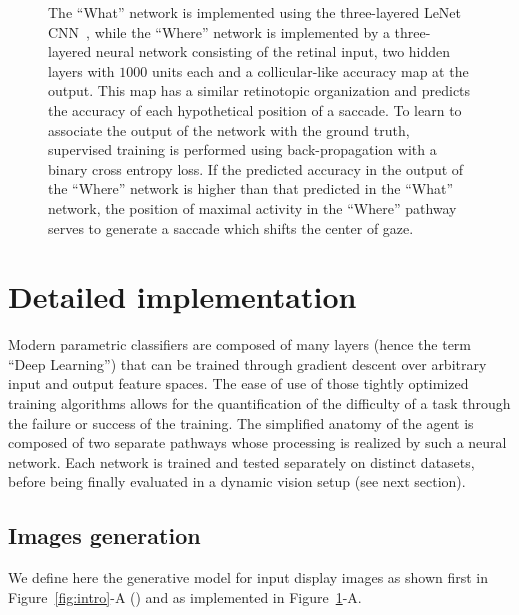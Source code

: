 \begin{figure}[t!]
{		The ``What'' network is implemented using the three-layered LeNet CNN~\cite{Lecun1998}, while the ``Where'' network is implemented by a three-layered neural network consisting of the retinal input, two hidden layers with $1000$ units each and a collicular-like accuracy map at the output.  This map has a similar retinotopic organization and predicts the accuracy of each hypothetical position of a saccade. %
		To learn to associate the output of the network with the ground truth, supervised training is performed using back-propagation with a binary cross entropy loss. 
		\D 
		If the predicted accuracy in the output of the ``Where'' network is higher than that predicted in the ``What'' network, the position of maximal activity in the ``Where'' pathway serves to generate a saccade which shifts the center of gaze. %
		\label{fig:methods}}%
\end{figure}%

\section*{Detailed implementation}
\label{sec:implementation}

Modern parametric classifiers are composed of many layers (hence the term ``Deep Learning'') that can be trained through gradient descent over arbitrary input and output feature spaces. The ease of use of those tightly optimized training algorithms allows for the quantification of the difficulty of a task through the failure or success of the training.
The simplified anatomy of the agent is composed of two separate pathways whose processing is realized by such a neural network. Each network is trained and tested separately on distinct datasets, before being finally evaluated in a dynamic vision setup (see next section). 


\subsection*{Images generation}
We define here the generative model for input display images as shown first in Figure~\ref{fig:intro}-A (\DIS ) and as implemented in Figure~\ref{fig:methods}-A.

